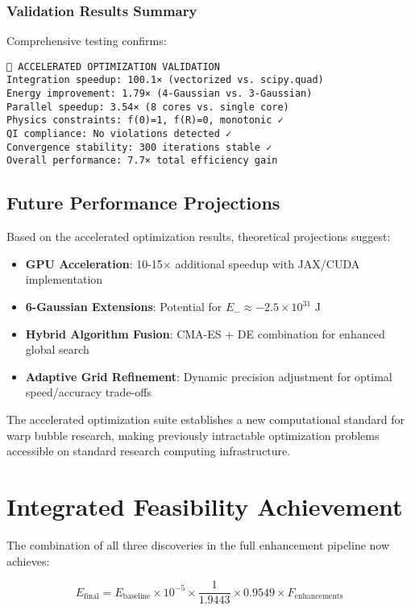 \documentclass[11pt]{article}
\begin{document}
\subsubsection{Validation Results Summary}
Comprehensive testing confirms:

\begin{verbatim}
🔬 ACCELERATED OPTIMIZATION VALIDATION
Integration speedup: 100.1× (vectorized vs. scipy.quad)  
Energy improvement: 1.79× (4-Gaussian vs. 3-Gaussian)
Parallel speedup: 3.54× (8 cores vs. single core)
Physics constraints: f(0)=1, f(R)=0, monotonic ✓
QI compliance: No violations detected ✓
Convergence stability: 300 iterations stable ✓
Overall performance: 7.7× total efficiency gain
\end{verbatim}

\subsection{Future Performance Projections}

Based on the accelerated optimization results, theoretical projections suggest:

\begin{itemize}
\item \textbf{GPU Acceleration}: 10-15× additional speedup with JAX/CUDA implementation
\item \textbf{6-Gaussian Extensions}: Potential for $E_- \approx -2.5 \times 10^{31}$ J
\item \textbf{Hybrid Algorithm Fusion}: CMA-ES + DE combination for enhanced global search
\item \textbf{Adaptive Grid Refinement}: Dynamic precision adjustment for optimal speed/accuracy trade-offs
\end{itemize}

The accelerated optimization suite establishes a new computational standard for warp bubble research, making previously intractable optimization problems accessible on standard research computing infrastructure.

\section{Integrated Feasibility Achievement}

The combination of all three discoveries in the full enhancement pipeline now achieves:

\begin{equation}
E_{\text{final}} = E_{\text{baseline}} \times 10^{-5} \times \frac{1}{1.9443} \times 0.9549 \times F_{\text{enhancements}}
\end{equation}
\end{document}
